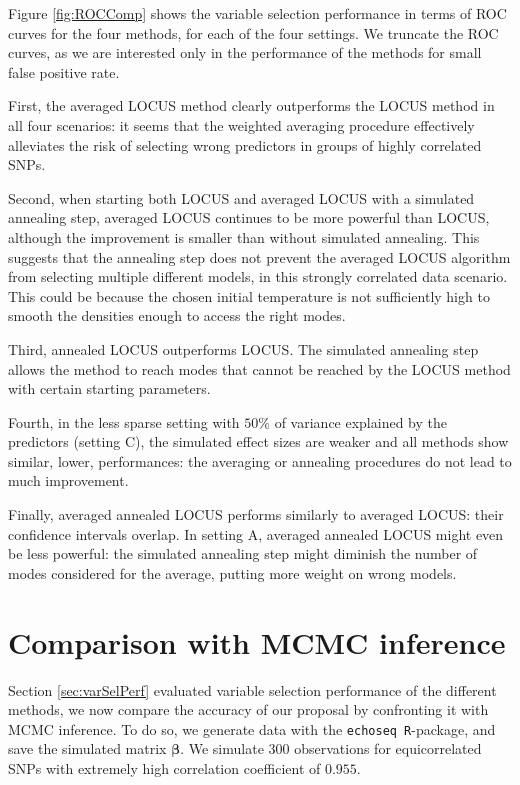 \documentclass[a4paper, 11pt]{report}
\numberwithin{equation}{chapter}
\begin{document}
Figure \ref{fig:ROCComp} shows the variable selection performance in terms of ROC curves for the four methods, for each of the four settings. We truncate the ROC curves, as we are interested only in the performance of the methods for small false positive rate.

First, the averaged LOCUS method clearly outperforms the LOCUS method in all four scenarios: it seems that the weighted averaging procedure effectively alleviates the risk of selecting wrong predictors in groups of highly correlated SNPs.

Second, when starting both LOCUS and averaged LOCUS with a simulated annealing step, averaged LOCUS continues to be more powerful than LOCUS, although the improvement is smaller than without simulated annealing. This suggests that the annealing step does not prevent the averaged LOCUS algorithm from selecting multiple different models, in this strongly correlated data scenario. This could be because the chosen initial temperature is not sufficiently high to smooth the densities enough to access the right modes.

Third, annealed LOCUS outperforms LOCUS. The simulated annealing step allows the method to reach modes that cannot be reached by the LOCUS method with certain starting parameters. 

Fourth, in the less sparse setting with $50\%$ of variance explained by the predictors (setting C), the simulated effect sizes are weaker and all methods show similar, lower, performances: the averaging or annealing procedures do not lead to much improvement.

Finally, averaged annealed LOCUS performs similarly to averaged LOCUS: their confidence intervals overlap. In setting A, averaged annealed LOCUS might even be less powerful: the simulated annealing step might diminish the number of modes considered for the average, putting more weight on wrong models.

\section{Comparison with MCMC inference}
Section \ref{sec:varSelPerf} evaluated variable selection performance of the different methods, we now compare the accuracy of our proposal by confronting it with MCMC inference. To do so, we generate data with the \texttt{echoseq R}-package, and save the simulated matrix $\boldsymbol{\beta}$. We simulate $300$ observations for equicorrelated SNPs with extremely high correlation coefficient of $0.955$.
\end{document}
